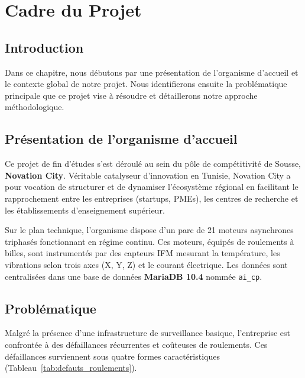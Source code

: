 \documentclass[12pt,a4paper]{report}
\begin{document}
\chapter{Cadre du Projet}

\section{Introduction}

Dans ce chapitre, nous débutons par une présentation de l'organisme d'accueil et le
contexte global de notre projet. Nous identifierons ensuite la problématique principale
que ce projet vise à résoudre et détaillerons notre approche méthodologique.

\section{Présentation de l'organisme d'accueil}

Ce projet de fin d'études s'est déroulé au sein du pôle de compétitivité de Sousse,
\textbf{Novation City}. Véritable catalyseur d'innovation en Tunisie, Novation City a pour
vocation de structurer et de dynamiser l'écosystème régional en facilitant le rapprochement entre les entreprises (startups, PMEs), les centres de recherche et les établissements d'enseignement supérieur.

Sur le plan technique, l'organisme dispose d'un parc de 21 moteurs asynchrones
triphasés fonctionnant en régime continu. Ces moteurs, équipés de roulements à billes,
sont instrumentés par des capteurs IFM mesurant la température, les vibrations selon
trois axes (X, Y, Z) et le courant électrique. Les données sont centralisées dans une
base de données \textbf{MariaDB 10.4} nommée \texttt{ai\_cp}.

\section{Problématique}

Malgré la présence d'une infrastructure de surveillance basique, l'entreprise est
confrontée à des défaillances récurrentes et coûteuses de roulements. Ces défaillances
surviennent sous quatre formes caractéristiques (Tableau~\ref{tab:defauts_roulements}).
\end{document}
